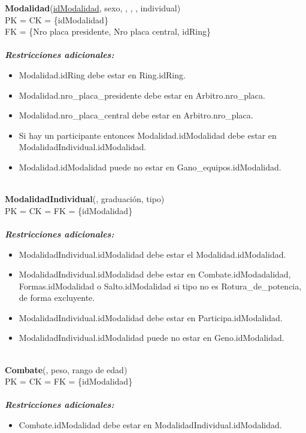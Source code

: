 \noindent
\textbf{Modalidad}(\underline{idModalidad}, sexo, , , , individual)\\
PK = CK = \{idModalidad\}\\
FK = \{Nro placa presidente, Nro placa central, idRing\}\\\\
\textbf{\textit{Restricciones adicionales:}}
\begin{itemize}
    \item Modalidad.idRing debe estar en Ring.idRing.
    \item Modalidad.nro\_placa\_presidente debe estar en Arbitro.nro\_placa.
    \item Modalidad.nro\_placa\_central debe estar en Arbitro.nro\_placa.
    \item Si hay un participante entonces Modalidad.idModalidad debe estar en ModalidadIndividual.idModalidad.
    \item Modalidad.idModalidad puede no estar en Gano\_equipos.idModalidad.
\end{itemize}\\

\noindent
\textbf{ModalidadIndividual}(, graduación, tipo)\\
PK = CK = FK = \{idModalidad\}\\\\
\textbf{\textit{Restricciones adicionales:}}
\begin{itemize}
    \item ModalidadIndividual.idModalidad debe estar el Modalidad.idModalidad.
    \item ModalidadIndividual.idModalidad debe estar en Combate.idModadalidad, Formas.idModalidad o Salto.idModalidad si tipo no es Rotura\_de\_potencia, de forma excluyente.
    \item ModalidadIndividual.idModalidad debe estar en Participa.idModalidad.
    \item ModalidadIndividual.idModalidad puede no estar en Geno.idModalidad.
\end{itemize}\\

\noindent
\textbf{Combate}(, peso, rango de edad)\\
PK = CK = FK = \{idModalidad\}\\\\
\textbf{\textit{Restricciones adicionales:}}
\begin{itemize}
    \item Combate.idModalidad debe estar en ModalidadIndividual.idModalidad.
\end{itemize}\\

